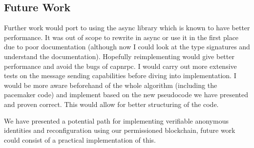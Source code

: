 
\subsection{Future Work}
Further work would port to using the async library which is known to have better performance. It was out of scope to rewrite in async or use it in the first place due to poor documentation (although now I could look at the type signatures and understand the documentation). Hopefully reimplementing would give better performance and avoid the bugs of capnrpc. I would carry out more extensive tests on the message sending capabilities before diving into implementation. I would be more aware beforehand of the whole algorithm (including the pacemaker code) and implement based on the new pseudocode we have presented and proven correct. This would allow for better structuring of the code.

We have presented a potential path for implementing verifiable anonymous identities and reconfiguration using our permissioned blockchain, future work could consist of a practical implementation of this.